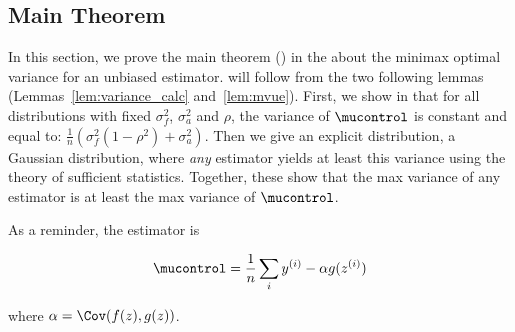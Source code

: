 \subsection{Main Theorem}

In this section, we prove the main theorem () in the  about the minimax optimal variance for an unbiased estimator.  will follow from the two following lemmas (Lemmas~\ref{lem:variance_calc} and~\ref{lem:mvue}). First, we show in  that for all distributions with fixed $\sigma^2_f$, $\sigma^2_a$ and $\rho$, the variance of $\mucontrol$ is constant and equal to: $\frac{1}{n}(\sigma_f^2(1-\rho^2)+\sigma_a^2)$.
Then we give an explicit distribution, a Gaussian distribution, where \emph{any} estimator yields at least this variance using the theory of sufficient statistics.
Together, these show that the max variance of any estimator is at least the max variance of $\mucontrol$.

As a reminder, the estimator is 

\begin{align}
\mucontrol = \frac{1}{n} \sum_i y^{(i)} - \alpha g(z^{(i)})
\end{align}

where $\alpha = \Cov(f(z),g(z))$.

